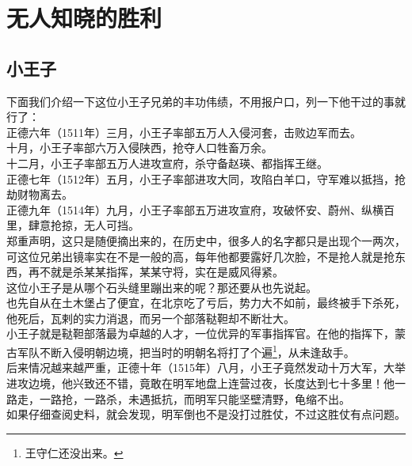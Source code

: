 \section{无人知晓的胜利}
\ifnum{}
	\begin{multicols}{\theparacolNo}
\fi
\subsection{小王子}
下面我们介绍一下这位小王子兄弟的丰功伟绩，不用报户口，列一下他干过的事就行了：\\

正德六年（1511年）三月，小王子率部五万人入侵河套，击败边军而去。\\

十月，小王子率部六万入侵陕西，抢夺人口牲畜万余。\\

十二月，小王子率部五万人进攻宣府，杀守备赵瑛、都指挥王继。\\

正德七年（1512年）五月，小王子率部进攻大同，攻陷白羊口，守军难以抵挡，抢劫财物离去。\\

正德九年（1514年）九月，小王子率部五万进攻宣府，攻破怀安、蔚州、纵横百里，肆意抢掠，无人可挡。\\

郑重声明，这只是随便摘出来的，在历史中，很多人的名字都只是出现个一两次，可这位兄弟出镜率实在不是一般的高，每年他都要露好几次脸，不是抢人就是抢东西，再不就是杀某某指挥，某某守将，实在是威风得紧。\\

这位小王子是从哪个石头缝里蹦出来的呢？那还要从也先说起。\\

也先自从在土木堡占了便宜，在北京吃了亏后，势力大不如前，最终被手下杀死，他死后，瓦剌的实力消退，而另一个部落鞑靼却不断壮大。\\

小王子就是鞑靼部落最为卓越的人才，一位优异的军事指挥官。在他的指挥下，蒙古军队不断入侵明朝边境，把当时的明朝名将打了个遍\footnote{王守仁还没出来。}，从未逢敌手。\\

后来情况越来越严重，正德十年（1515年）八月，小王子竟然发动十万大军，大举进攻边境，他兴致还不错，竟敢在明军地盘上连营过夜，长度达到七十多里！他一路走，一路抢，一路杀，未遇抵抗，而明军只能坚壁清野，龟缩不出。\\

如果仔细查阅史料，就会发现，明军倒也不是没打过胜仗，不过这胜仗有点问题。\\


\end{multicols}
